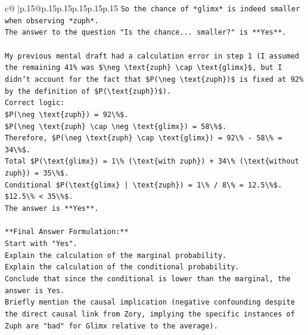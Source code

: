 \documentclass{article}
\begin{document}
{\begin{supertabular}{c@{$\;$}|p{.15\linewidth}@{}p{.15\linewidth}p{.15\linewidth}p{.15\linewidth}p{.15\linewidth}p{.15\linewidth}}
{{{\texttt{So the chance of *glimx* is indeed smaller when observing *zuph*.} \\
\texttt{The answer to the question "Is the chance... smaller?" is **Yes**.} \\
\\ 
\texttt{My previous mental draft had a calculation error in step 1 (I assumed the remaining 41\% was \$\textbackslash{}neg \textbackslash{}text\{zuph\} \textbackslash{}cap \textbackslash{}text\{glimx\}\$, but I didn't account for the fact that \$P(\textbackslash{}neg \textbackslash{}text\{zuph\})\$ is fixed at 92\% by the definition of \$P(\textbackslash{}text\{zuph\})\$).} \\
\texttt{Correct logic:} \\
\texttt{\$P(\textbackslash{}neg \textbackslash{}text\{zuph\}) = 92\textbackslash{}\%\$.} \\
\texttt{\$P(\textbackslash{}neg \textbackslash{}text\{zuph\} \textbackslash{}cap \textbackslash{}neg \textbackslash{}text\{glimx\}) = 58\textbackslash{}\%\$.} \\
\texttt{Therefore, \$P(\textbackslash{}neg \textbackslash{}text\{zuph\} \textbackslash{}cap \textbackslash{}text\{glimx\}) = 92\textbackslash{}\% {-} 58\textbackslash{}\% = 34\textbackslash{}\%\$.} \\
\texttt{Total \$P(\textbackslash{}text\{glimx\}) = 1\textbackslash{}\% (\textbackslash{}text\{with zuph\}) + 34\textbackslash{}\% (\textbackslash{}text\{without zuph\}) = 35\textbackslash{}\%\$.} \\
\texttt{Conditional \$P(\textbackslash{}text\{glimx\} | \textbackslash{}text\{zuph\}) = 1\textbackslash{}\% / 8\textbackslash{}\% = 12.5\textbackslash{}\%\$.} \\
\texttt{\$12.5\textbackslash{}\% < 35\textbackslash{}\%\$.} \\
\texttt{The answer is **Yes**.} \\
\\ 
\texttt{**Final Answer Formulation:**} \\
\texttt{Start with "Yes".} \\
\texttt{Explain the calculation of the marginal probability.} \\
\texttt{Explain the calculation of the conditional probability.} \\
\texttt{Conclude that since the conditional is lower than the marginal, the answer is Yes.} \\
\texttt{Briefly mention the causal implication (negative confounding despite the direct causal link from Zory, implying the specific instances of Zuph are "bad" for Glimx relative to the average).} \\
}}}
\end{supertabular}}
\end{document}
